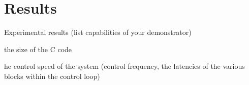 \documentclass[final]{article}
\begin{document}
\section{Results}
Experimental results (list capabilities of your demonstrator)

the size of the C code

he control speed of the system (control frequency, the latencies of the various blocks within the control loop)
\end{document}
